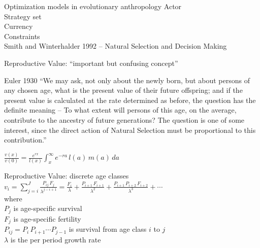 \documentclass{beamer}
\begin{document}
\begin{frame}{Optimization models in evolutionary anthropology}
Actor\\
\pause
\vspace{1cm}
Strategy set\\
\pause
\vspace{1cm}
Currency\\
\pause
\vspace{1cm}
Constraints\\
\pause
\vspace{1cm}
Smith and Winterhalder 1992 -- Natural Selection and Decision Making\\
\end{frame}

\begin{frame}{Reproductive Value: ``important but confusing concept''}
\begin{block}{Euler 1930}
``We may ask, not only about the newly born, but about persons of any chosen age, what is the present value of their future offspring; and if the present value is calculated at the rate determined as before, the question has the definite meaning -- To what extent will persons of this age, on the average, contribute to the ancestry of future generations? The question is one of some interest, since the direct action of Natural Selection must be proportional to this contribution.''
\end{block}
\vspace{.5cm}
\pause
$\frac{v(x)}{v(0)} = \frac{e^{rx}}{l(x)} \int_{x}^{\infty} e^{-ra} \, l(a) \, m(a) \, da$
\end{frame}

\begin{frame}{Reproductive Value: discrete age classes}
  $v_i =  \displaystyle\sum\limits_{j=i}^{J} \frac{P_{ij} \, F_j}{\lambda^{j-i+1}} = \frac{F_i}{\lambda} + \frac{P_{i+1} \, F_{i+1}}{\lambda^2} + \frac{P_{i+1} \, P_{i+2} \, F_{i+2}}{\lambda^3} + \cdots$\\
  \vspace{.5cm}
  where\\
  \vspace{.5cm}
  $P_j$ is age-specific survival\\
  \vspace{.5cm}
  $F_j$ is age-specific fertility\\
  \vspace{.5cm}
  $P_{ij} = P_i \, P_{i+1} \cdots P_{j-1}$ is survival from age class $i$ to $j$\\
  \vspace{.5cm}
  $\lambda$ is the per period growth rate\\
\end{frame}
\end{document}
